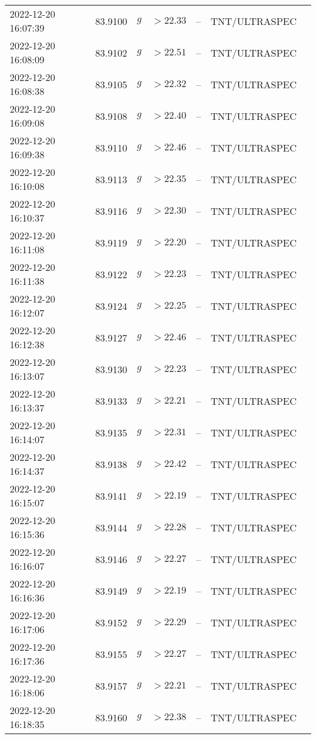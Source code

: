 \documentclass{nature_plusfigure}
\begin{document}
\begin{supplement}
\begin{center}
\begin{longtable}{lllllll}
2022-12-20 16:07:39 & 83.9100 & $g$ & $>22.33$ & -- & TNT/ULTRASPEC &  \\ 
2022-12-20 16:08:09 & 83.9102 & $g$ & $>22.51$ & -- & TNT/ULTRASPEC &  \\ 
2022-12-20 16:08:38 & 83.9105 & $g$ & $>22.32$ & -- & TNT/ULTRASPEC &  \\ 
2022-12-20 16:09:08 & 83.9108 & $g$ & $>22.40$ & -- & TNT/ULTRASPEC &  \\ 
2022-12-20 16:09:38 & 83.9110 & $g$ & $>22.46$ & -- & TNT/ULTRASPEC &  \\ 
2022-12-20 16:10:08 & 83.9113 & $g$ & $>22.35$ & -- & TNT/ULTRASPEC &  \\ 
2022-12-20 16:10:37 & 83.9116 & $g$ & $>22.30$ & -- & TNT/ULTRASPEC &  \\ 
2022-12-20 16:11:08 & 83.9119 & $g$ & $>22.20$ & -- & TNT/ULTRASPEC &  \\ 
2022-12-20 16:11:38 & 83.9122 & $g$ & $>22.23$ & -- & TNT/ULTRASPEC &  \\ 
2022-12-20 16:12:07 & 83.9124 & $g$ & $>22.25$ & -- & TNT/ULTRASPEC &  \\ 
2022-12-20 16:12:38 & 83.9127 & $g$ & $>22.46$ & -- & TNT/ULTRASPEC &  \\ 
2022-12-20 16:13:07 & 83.9130 & $g$ & $>22.23$ & -- & TNT/ULTRASPEC &  \\ 
2022-12-20 16:13:37 & 83.9133 & $g$ & $>22.21$ & -- & TNT/ULTRASPEC &  \\ 
2022-12-20 16:14:07 & 83.9135 & $g$ & $>22.31$ & -- & TNT/ULTRASPEC &  \\ 
2022-12-20 16:14:37 & 83.9138 & $g$ & $>22.42$ & -- & TNT/ULTRASPEC &  \\ 
2022-12-20 16:15:07 & 83.9141 & $g$ & $>22.19$ & -- & TNT/ULTRASPEC &  \\ 
2022-12-20 16:15:36 & 83.9144 & $g$ & $>22.28$ & -- & TNT/ULTRASPEC &  \\ 
2022-12-20 16:16:07 & 83.9146 & $g$ & $>22.27$ & -- & TNT/ULTRASPEC &  \\ 
2022-12-20 16:16:36 & 83.9149 & $g$ & $>22.19$ & -- & TNT/ULTRASPEC &  \\ 
2022-12-20 16:17:06 & 83.9152 & $g$ & $>22.29$ & -- & TNT/ULTRASPEC &  \\ 
2022-12-20 16:17:36 & 83.9155 & $g$ & $>22.27$ & -- & TNT/ULTRASPEC &  \\ 
2022-12-20 16:18:06 & 83.9157 & $g$ & $>22.21$ & -- & TNT/ULTRASPEC &  \\ 
2022-12-20 16:18:35 & 83.9160 & $g$ & $>22.38$ & -- & TNT/ULTRASPEC &  \\ 

\end{longtable}
\end{center}
\end{supplement}
\end{document}
